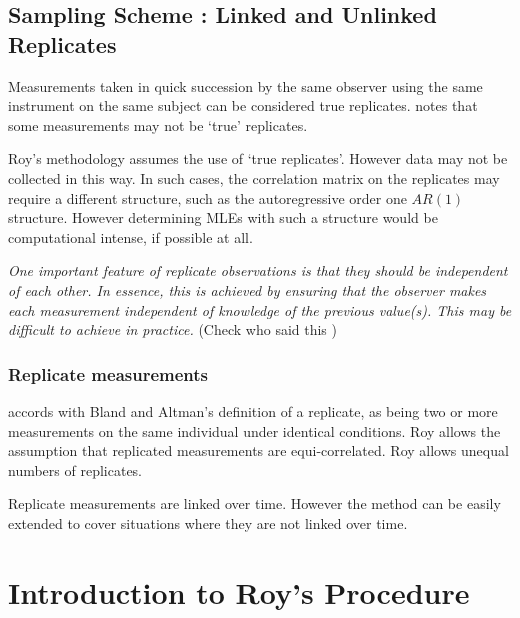 \documentclass[12pt, a4paper]{report}
\theoremstyle{plain}
\theoremstyle{definition}
\theoremstyle{remark}
\begin{document}



\newpage
	\section{Sampling Scheme : Linked and Unlinked Replicates}
	Measurements taken in quick succession by the same observer using the same instrument on the same subject can be considered true replicates. \citet{ARoy2009} notes that some measurements may not be `true' replicates.
	
	Roy's methodology assumes the use of `true replicates'. However data may not be collected in this way. In such cases, the correlation matrix on the replicates may require a different structure, such as the autoregressive order one $AR(1)$ structure. However determining MLEs with such a structure would be computational intense, if possible at all.
	
	
	
	\emph{
		One important feature of replicate observations is that they should be independent
		of each other. In essence, this is achieved by ensuring that the observer makes each
		measurement independent of knowledge of the previous value(s). This may be difficult
		to achieve in practice.} (Check who said this
	)
	
	
\subsection{Replicate measurements}
\citet{ARoy2009} accords with Bland and Altman’s definition of a replicate, as being two or more measurements on the same individual under identical conditions.
Roy allows the assumption that replicated measurements are equi-correlated.
Roy allows unequal numbers of replicates.

Replicate measurements are linked over time. However the method can be easily extended to cover situations where they are not linked over time.


\chapter{Introduction to Roy's Procedure}
\end{document}
